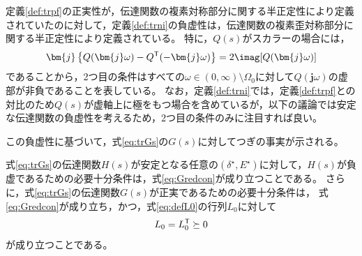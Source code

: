 \documentclass[tombow,dvipdfmx]{corona-a5}
\begin{document}
定義\ref{def:trpf}の正実性が，伝達関数の複素対称部分に関する半正定性により定義されていたのに対して，定義\ref{def:trni}の負虚性は，伝達関数の複素歪対称部分に関する半正定性により定義されている。
特に，$Q(s)$がスカラーの場合には，
\begin{align*}
\bm{j}\left\{Q(\bm{j} \omega) - Q^{\sf T}(-\bm{j} \omega) \right\}
= 2 \imag[Q(\bm{j} \omega)]
\end{align*}
であることから，2つ目の条件はすべての$\omega \in (0,\infty)\setminus \Omega_0$に対して$Q(\bm{j}\omega)$の虚部が非負であることを表している。
なお，定義\ref{def:trni}では，定義\ref{def:trpf}との対比のため$Q(s)$が虚軸上に極をもつ場合を含めているが，以下の議論では安定な伝達関数の負虚性を考えるため，2つ目の条件のみに注目すれば良い。

この負虚性に基づいて，式\ref{eq:trGs}の$G(s)$に対してつぎの事実が示される。

\begin{定理}[電気的サブシステムの伝達関数の正実性]
\label{thm:EdynNI}
式\ref{eq:trGs}の伝達関数$H(s)$が安定となる任意の$(\delta^{\star},E^{\star})$に対して，$H(s)$が負虚であるための必要十分条件は，式\ref{eq:Gredcon}が成り立つことである。
さらに，式\ref{eq:trGs}の伝達関数$G(s)$が正実であるための必要十分条件は，
式\ref{eq:Gredcon}が成り立ち，かつ，式\ref{eq:defL0}の行列$L_0$に対して
\begin{align}\label{eq:pdsp}
L_0 =L_0^{\sf T} \succeq 0
\end{align}
が成り立つことである。
\end{定理}
\end{document}
